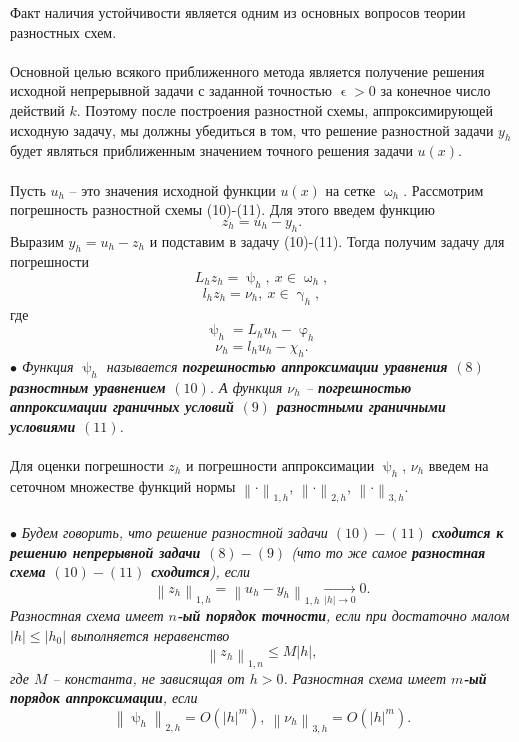 \documentclass[a4paper, 12pt]{report}
\numberwithin{equation}{section}
\renewcommand{\leq}{\leqslant}
\renewcommand{\gamma}{\upgamma}
\renewcommand{\varphi}{\upvarphi}
\renewcommand{\psi}{\uppsi}
\renewcommand{\omega}{\upomega}
\renewcommand{\epsilon}{\upvarepsilon}
\newcommand\Norm[1]{\left\| #1 \right\|}
\begin{document}
	Факт наличия устойчивости является одним из основных вопросов теории разностных схем.\\\\
	Основной целью всякого приближенного метода является получение решения исходной непрерывной задачи с заданной точностью $\epsilon>0$ за конечное число действий $k$. Поэтому после построения разностной схемы, аппроксимирующей исходную задачу, мы должны убедиться в том, что решение разностной задачи $y_h$ будет являться приближенным значением точного решения задачи $u(x)$.\\\\
	Пусть $u_h$  -- это значения исходной функции $u(x)$ на сетке $\omega_h$. Рассмотрим погрешность разностной схемы (10)-(11). Для этого введем функцию $$z_h = u_h - y_h.$$ Выразим $y_h = u_h - z_h$ и подставим в задачу (10)-(11). Тогда получим задачу для погрешности 
	\begin{equation}
	L_h z_h = \psi_h,\ x \in \omega_h,
	\end{equation}
	\begin{equation}
		l_h z_h = \nu_h,\ x \in \gamma_h,
	\end{equation}
	где
	$$\psi_h = L_h u_h - \varphi_h$$
	$$\nu_h = l_hu_h - \chi_h.$$
	\textit{$\bullet$ Функция $\psi_h$ называется \textbf{погрешностью аппроксимации уравнения $(8)$ разностным уравнением $(10)$}. А функция $\nu_h$ -- \textbf{погрешностью аппроксимации граничных условий $(9)$ разностными граничными условиями $(11)$}.}\\\\
	Для оценки погрешности $z_h$ и погрешности аппроксимации $\psi_h$, $\nu_h$ введем на сеточном множестве функций нормы $\Norm{\cdot}_{1,h}$, $\Norm{\cdot}_{2,h}$, $\Norm{\cdot}_{3,h}$.\\\\
	$\bullet$ \textit{Будем говорить, что решение разностной задачи $(10)-(11)$ \textbf{сходится к решению непрерывной задачи $(8)-(9)$} (что то же самое \textbf{разностная схема $(10)-(11)$ сходится}), если }
	\begin{equation}
		\Norm{z_h}_{1,h}= \Norm{u_h - y_h}_{1,h} \xrightarrow[|h| \to 0]{}0.
	\end{equation}
	\textit{Разностная схема имеет \textbf{$n$-ый порядок точности}, если при достаточно малом $|h|\leq |h_0|$ выполняется неравенство}
	\begin{equation}
		\Norm{z_h}_{1,n}\leq M|h|,
	\end{equation}
	\textit{где $M$ -- константа, не зависящая от $h>0$.}
	\textit{Разностная схема имеет \textbf{$m$-ый порядок аппроксимации}, если} \begin{equation}
		\Norm{\psi_h}_{2,h} = O(|h|^m),\ \Norm{\nu_h}_{3,h} = O(|h|^m).
	\end{equation}
\end{document}

